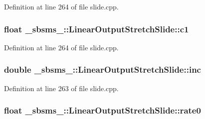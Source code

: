 Definition at line 264 of file slide.\+cpp.

\subsubsection[{\texorpdfstring{c1}{c1}}]{\setlength{\rightskip}{0pt plus 5cm}float \+\_\+sbsms\+\_\+\+::\+Linear\+Output\+Stretch\+Slide\+::c1\hspace{0.3cm}{\ttfamily [protected]}}\hypertarget{class__sbsms___1_1_linear_output_stretch_slide_a6b29e47af9a252c5ca82cb4a1b36f607}{}\label{class__sbsms___1_1_linear_output_stretch_slide_a6b29e47af9a252c5ca82cb4a1b36f607}


Definition at line 264 of file slide.\+cpp.

\subsubsection[{\texorpdfstring{inc}{inc}}]{\setlength{\rightskip}{0pt plus 5cm}double \+\_\+sbsms\+\_\+\+::\+Linear\+Output\+Stretch\+Slide\+::inc\hspace{0.3cm}{\ttfamily [protected]}}\hypertarget{class__sbsms___1_1_linear_output_stretch_slide_afbec12c31053161d80d16c9f0b08e5c9}{}\label{class__sbsms___1_1_linear_output_stretch_slide_afbec12c31053161d80d16c9f0b08e5c9}


Definition at line 263 of file slide.\+cpp.

\subsubsection[{\texorpdfstring{rate0}{rate0}}]{\setlength{\rightskip}{0pt plus 5cm}float \+\_\+sbsms\+\_\+\+::\+Linear\+Output\+Stretch\+Slide\+::rate0\hspace{0.3cm}{\ttfamily [protected]}}\hypertarget{class__sbsms___1_1_linear_output_stretch_slide_af6573616ea89a1ee7bb35cb21e3b8a98}{}\label{class__sbsms___1_1_linear_output_stretch_slide_af6573616ea89a1ee7bb35cb21e3b8a98}


